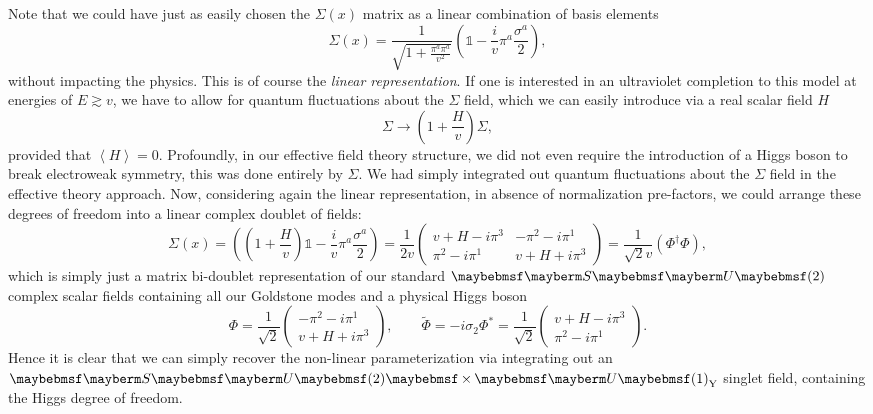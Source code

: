 Note that we could have just as easily chosen the $\Sigma(x)$ matrix as a linear combination of basis elements
\begin{equation}
\Sigma(x)=\frac{1}{\sqrt{1+\frac{\pi^a \pi^a}{v^2}}}\left( \mathbb{1}-\frac{i}{v}\pi^a\frac{\sigma^a}{2} \right),
\end{equation}
without impacting the physics. This is of course the \textit{linear representation}. If one is interested in an ultraviolet completion to this model at energies of $E \gtrsim v$, we have to allow for quantum fluctuations about the $\Sigma$ field, which we can easily introduce via a real scalar field $H$
\begin{equation}
\Sigma \rightarrow \left( 1+\frac{H}{v}\right)\Sigma,
\end{equation}
provided that $\left\langle H \right\rangle=0$. Profoundly, in our effective field theory structure, we did not even require the introduction of a Higgs boson to break electroweak symmetry, this was done entirely by $\Sigma$. We had simply integrated out quantum fluctuations about the $\Sigma$ field in the effective theory approach. Now, considering again the linear representation, in absence of normalization pre-factors, we could arrange these degrees of freedom into a linear complex doublet of fields:
\begin{equation}
\Sigma(x)=\left( \left( 1+\frac{H}{v}\right)\mathbb{1}-\frac{i}{v}\pi^a\frac{\sigma^a}{2} \right)=\frac{1}{2v} \begin{pmatrix} v+H-i\pi^3  &  -\pi^2-i\pi^1\\
\pi^2-i\pi^1 & v+H+i\pi^3
\end{pmatrix}=\frac{1}{\sqrt{2}v}(\Phi^{\dagger} \Phi),
\end{equation}
which is simply just a matrix bi-doublet representation of our standard $\SUgroup{2}$ complex scalar fields containing all our Goldstone modes and a physical Higgs boson
\begin{equation}
\Phi=\frac{1}{\sqrt{2}}\begin{pmatrix} 
-\pi^2-i\pi^1\\
 v+H+i\pi^3
\end{pmatrix},\qquad \tilde{\Phi}=-i\sigma_2 \Phi^*=\frac{1}{\sqrt{2}}\begin{pmatrix} 
v+H-i\pi^3\\
\pi^2-i\pi^1
\end{pmatrix}.
\end{equation}
Hence it is clear that we can simply recover the non-linear parameterization via integrating out an $\SUgroup{2} \times \Ugroup{1}_{\text{Y}}$ singlet field, containing the Higgs degree of freedom.

